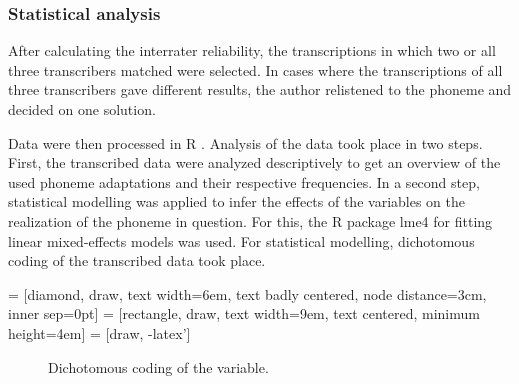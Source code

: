 \documentclass[output=paper]{langscibook}
\begin{document}
\subsubsection{Statistical analysis}\label{baumler:sec:statistical_analysis}
After calculating the interrater reliability, the transcriptions in which two or all three transcribers matched were selected. In cases where the transcriptions of all three transcribers gave different results, the author relistened to the phoneme and decided on one solution. 

Data were then processed in R \citep[]{R}. Analysis of the data took place in two steps. First, the transcribed data were analyzed descriptively to get an overview of the used phoneme adaptations and their respective frequencies. In a second step,  statistical modelling was applied to infer the effects of the variables on the realization of the phoneme in question. For this, the R package lme4 \citep[]{lme} for fitting linear mixed-effects models was used. For statistical modelling, dichotomous coding of the transcribed data took place. 



 = [diamond, draw, 
    text width=6em, text badly centered, node distance=3cm, inner sep=0pt]
 = [rectangle, draw, 
    text width=9em, text centered, minimum height=4em]
 = [draw, -latex']

\begin{figure}
\caption{Dichotomous coding of the variable.} %
\label{baumler:fig:coding} %
\end{figure}
\end{document}
